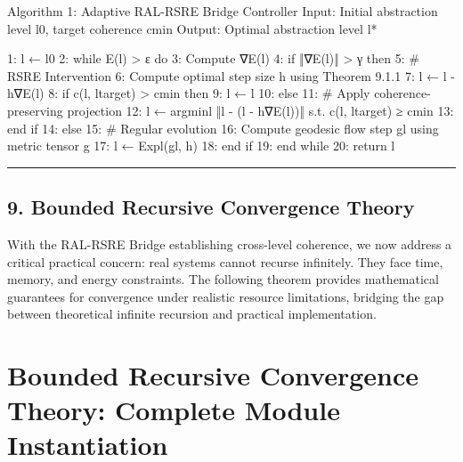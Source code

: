 \documentclass[
]{article}
\newenvironment{Shaded}{}{}
\newcommand{\NormalTok}[1]{#1}
\begin{document}
\begin{Shaded}
\begin{Highlighting}[]
\NormalTok{Algorithm 1: Adaptive RAL{-}RSRE Bridge Controller}
\NormalTok{Input: Initial abstraction level l0, target coherence cmin}
\NormalTok{Output: Optimal abstraction level l*}

\NormalTok{1: l ← l0}
\NormalTok{2: while E(l) \textgreater{} ε do}
\NormalTok{3:     Compute ∇E(l)}
\NormalTok{4:     if ‖∇E(l)‖ \textgreater{} γ then}
\NormalTok{5:         \# RSRE Intervention}
\NormalTok{6:         Compute optimal step size h using Theorem 9.1.1}
\NormalTok{7:         l\textquotesingle{} ← l {-} h∇E(l)}
\NormalTok{8:         if c(l\textquotesingle{}, ltarget) \textgreater{} cmin then}
\NormalTok{9:             l ← l\textquotesingle{}}
\NormalTok{10:         else}
\NormalTok{11:             \# Apply coherence{-}preserving projection}
\NormalTok{12:             l ← argminl\textquotesingle{} ‖l\textquotesingle{} {-} (l {-} h∇E(l))‖ s.t. c(l\textquotesingle{}, ltarget) ≥ cmin}
\NormalTok{13:         end if}
\NormalTok{14:     else}
\NormalTok{15:         \# Regular evolution}
\NormalTok{16:         Compute geodesic flow step gl using metric tensor g}
\NormalTok{17:         l ← Expl(gl, h)}
\NormalTok{18:     end if}
\NormalTok{19: end while}
\NormalTok{20: return l}
\end{Highlighting}
\end{Shaded}

\begin{center}\rule{0.5\linewidth}{0.5pt}\end{center}

\subsection{9. Bounded Recursive Convergence
Theory}\label{9-bounded-recursive-convergence-theory}

With the RAL-RSRE Bridge establishing cross-level coherence, we now
address a critical practical concern: real systems cannot recurse
infinitely. They face time, memory, and energy constraints. The
following theorem provides mathematical guarantees for convergence under
realistic resource limitations, bridging the gap between theoretical
infinite recursion and practical implementation.

\section{Bounded Recursive Convergence Theory: Complete Module
Instantiation}\label{bounded-recursive-convergence-theory-complete-module-instantiation}
\end{document}

